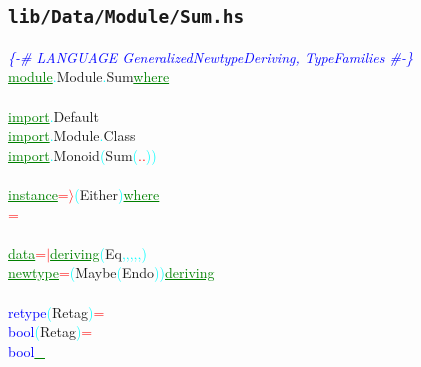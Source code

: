 \subsection{\texttt{lib/Data/Module/Sum.hs}}
\label{mod:Data.Module.Sum}
\textcolor{blue}{{\it{}\{-\# LANGUAGE GeneralizedNewtypeDeriving, TypeFamilies \#-\}}}\\\textcolor{green}{\underline{module}}\textcolor{cyan}{.}{\rm{}Module}\textcolor{cyan}{.}{\rm{}Sum}\hsspace \textcolor{green}{\underline{where}}\\\\\textcolor{green}{\underline{import}}\textcolor{cyan}{.}{\rm{}Default}\\\textcolor{green}{\underline{import}}\textcolor{cyan}{.}{\rm{}Module}\textcolor{cyan}{.}{\rm{}Class}\\\textcolor{green}{\underline{import}}\textcolor{cyan}{.}{\rm{}Monoid}\hsspace \textcolor{cyan}{(}{\rm{}Sum}\textcolor{cyan}{(}\textcolor{red}{..}\textcolor{cyan}{)}\textcolor{cyan}{)}\\\\\textcolor{green}{\underline{instance}}\hsspace \textcolor{red}{=\ensuremath{\rangle}}\hsspace \textcolor{cyan}{(}{\rm{}Either}\textcolor{cyan}{)}\hsspace \textcolor{green}{\underline{where}}\\\hsspace \textcolor{red}{=}\\\\\textcolor{green}{\underline{data}}\hsspace \textcolor{red}{=}\hsspace \textcolor{red}{\ensuremath{|}}\hsspace \textcolor{green}{\underline{deriving}}\hsspace \textcolor{cyan}{(}{\rm{}Eq}\textcolor{cyan}{,}\textcolor{cyan}{,}\textcolor{cyan}{,}\textcolor{cyan}{,}\textcolor{cyan}{,}\textcolor{cyan}{)}\\\textcolor{green}{\underline{newtype}}\hsspace \textcolor{red}{=}\hsspace \textcolor{cyan}{(}{\rm{}Maybe}\hsspace \textcolor{cyan}{(}{\rm{}Endo}\textcolor{cyan}{)}\textcolor{cyan}{)}\hsspace \textcolor{green}{\underline{deriving}}\\\\\textcolor{blue}{retype}\hsspace \textcolor{cyan}{(}{\rm{}Retag}\textcolor{cyan}{)}\hsspace \textcolor{red}{=}\\\textcolor{blue}{bool}\hsspace \textcolor{cyan}{(}{\rm{}Retag}\textcolor{cyan}{)}\hsspace \textcolor{red}{=}\\\textcolor{blue}{bool}\hsspace \textcolor{green}{\underline{\_}}\hsspace \hsspace \hsspace \hsspace \hsspace \hsspace \hsspace \hsspace \hsspace \hsspace \hsspace \hsspace \hsspace \hsspace 